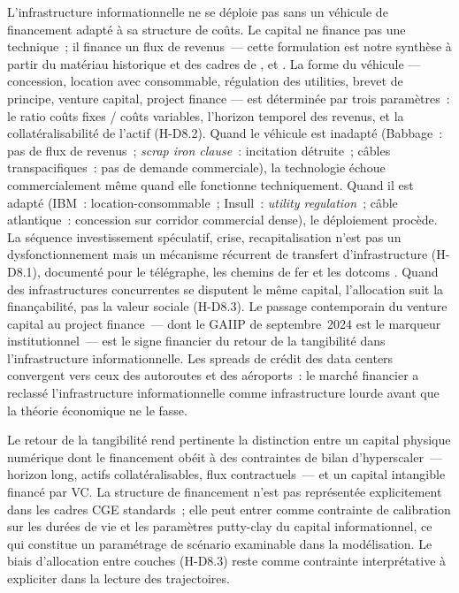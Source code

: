 L'infrastructure informationnelle ne se déploie pas sans un véhicule de financement adapté à sa structure de coûts. Le capital ne finance pas une technique~; il finance un flux de revenus~--- cette formulation est notre synthèse à partir du matériau historique et des cadres de \textcite{perez_technological_2002}, \textcite{hall_financing_2010} et \textcite{esty_why_2004}. La forme du véhicule --- concession, location avec consommable, régulation des utilities, brevet de principe, venture capital, project finance --- est déterminée par trois paramètres~: le ratio coûts fixes / coûts variables, l'horizon temporel des revenus, et la collatéralisabilité de l'actif (H-D8.2). Quand le véhicule est inadapté (Babbage~: pas de flux de revenus~; \emph{scrap iron clause}~: incitation détruite~; câbles transpacifiques~: pas de demande commerciale), la technologie échoue commercialement même quand elle fonctionne techniquement. Quand il est adapté (IBM~: location-consommable~; Insull~: \emph{utility regulation}~; câble atlantique~: concession sur corridor commercial dense), le déploiement procède. La séquence investissement spéculatif, crise, recapitalisation n'est pas un dysfonctionnement mais un mécanisme récurrent de transfert d'infrastructure (H-D8.1), documenté pour le télégraphe, les chemins de fer et les dotcoms \parencite{perez_technological_2002, nonnenmacher_telegraph_2001, reinhart_this_2009}. Quand des infrastructures concurrentes se disputent le même capital, l'allocation suit la finançabilité, pas la valeur sociale (H-D8.3). Le passage contemporain du venture capital au project finance~--- dont le GAIIP de septembre~2024 est le marqueur institutionnel~--- est le signe financier du retour de la tangibilité dans l'infrastructure informationnelle. Les spreads de crédit des data centers convergent vers ceux des autoroutes et des aéroports~: le marché financier a reclassé l'infrastructure informationnelle comme infrastructure lourde avant que la théorie économique ne le fasse.

Le retour de la tangibilité rend pertinente la distinction entre un capital physique numérique dont le financement obéit à des contraintes de bilan d'hyperscaler~--- horizon long, actifs collatéralisables, flux contractuels~--- et un capital intangible financé par VC. La structure de financement n'est pas représentée explicitement dans les cadres CGE standards~; elle peut entrer comme contrainte de calibration sur les durées de vie et les paramètres putty-clay du capital informationnel, ce qui constitue un paramétrage de scénario examinable dans la modélisation. Le biais d'allocation entre couches (H-D8.3) reste comme contrainte interprétative à expliciter dans la lecture des trajectoires.


